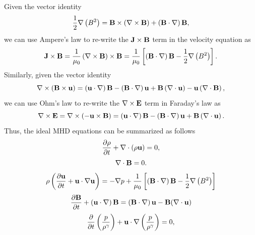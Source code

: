 \documentclass[a4paper,11pt]{report}
\begin{document}
Given the vector identity
\begin{equation}
    \frac{1}{2} \nabla \left ( B^2 \right ) = \mathbf{B} \times \left (\nabla \times \mathbf{B} \right ) + \left ( \mathbf{B} \cdot \nabla \right ) \mathbf{B},
\end{equation}
we can use Ampere's law to re-write the $\mathbf{J} \times \mathbf{B}$ term in the velocity equation as
\begin{equation}
    \mathbf{J} \times \mathbf{B} = \frac{1}{\mu_0} \left ( \nabla \times \mathbf{B} \right ) \times \mathbf{B} = \frac{1}{\mu_0} \left [ \left ( \mathbf{B} \cdot \nabla \right ) \mathbf{B} - \frac{1}{2} \nabla \left ( B^2 \right ) \right ].
\end{equation}
Similarly, given the vector identity
\begin{equation}
    \nabla \times \left ( \mathbf{B} \times \mathbf{u} \right ) = \left (\mathbf{u} \cdot \nabla \right ) \mathbf{B} - \left ( \mathbf{B} \cdot \nabla \right ) \mathbf{u} + \mathbf{B} \left ( \nabla \cdot \mathbf{u} \right ) - \mathbf{u} \left ( \nabla \cdot \mathbf{B} \right ),
\end{equation}
we can use Ohm's law to re-write the $\nabla \times \mathbf{E}$ term in Faraday's law as
\begin{equation}
    \nabla \times \mathbf{E} = \nabla \times (-\mathbf{u} \times \mathbf{B}) = \left (\mathbf{u} \cdot \nabla \right ) \mathbf{B} - \left ( \mathbf{B} \cdot \nabla \right ) \mathbf{u} + \mathbf{B} \left ( \nabla \cdot \mathbf{u} \right ).
\end{equation}
Thus, the ideal MHD equations can be summarized as follows
\begin{equation}
    \frac{\partial \rho}{\partial t} + \nabla \cdot (\rho \mathbf{u}) = 0,
\end{equation}
\begin{equation}
    \nabla \cdot \mathbf{B} = 0.
    \end{equation}
\begin{equation}
    \rho \left (\frac{\partial \mathbf{u}}{\partial t} + \mathbf{u} \cdot \nabla \mathbf{u} \right ) = - \nabla p  + \frac{1}{\mu_0} \left [ \left ( \mathbf{B} \cdot \nabla \right ) \mathbf{B} - \frac{1}{2} \nabla \left ( B^2 \right ) \right ]
\end{equation}
\begin{equation}
    \frac{\partial \mathbf{B}}{\partial t} + \left ( \mathbf{u} \cdot \nabla \right ) \mathbf{B} = \left ( \mathbf{B} \cdot \nabla \right ) \mathbf{u} - \mathbf{B} (\nabla \cdot \mathbf{u})
\end{equation}
\begin{equation}
    \frac{\partial}{\partial t} \left ( \frac{p}{\rho^\gamma} \right ) + \mathbf{u} \cdot \nabla \left (\frac{p}{\rho^\gamma} \right ) = 0,
\end{equation}
\end{document}
